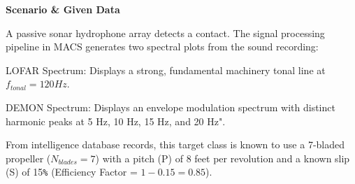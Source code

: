 \textbf{Scenario \& Given Data}

A passive sonar hydrophone array detects a contact. The signal processing pipeline in MACS generates two spectral plots from the sound recording:

\begin{compactenum}
    \item LOFAR Spectrum: Displays a strong, fundamental machinery tonal line at $f_{tonal} = 120 Hz$.
    \item DEMON Spectrum: Displays an envelope modulation spectrum with distinct harmonic peaks at 5 Hz, 10 Hz, 15 Hz, and 20 Hz".
\end{compactenum}

From intelligence database records, this target class is known to use a 7-bladed propeller ($N_{blades} = 7$) with a pitch (P) of 8 feet per revolution and a known slip (S) of 15\verb|%| (Efficiency Factor = $1 - 0.15 = 0.85$).

